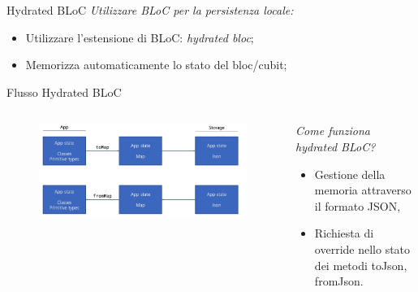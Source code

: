 \documentclass{../libs/presentation_format}
\begin{document}

\begin{frame}{Hydrated BLoC}
	\emph{Utilizzare BLoC per la persistenza locale:}
	\begin{itemize}
		\item Utilizzare l'estensione di BLoC: \emph{hydrated bloc};
		\item Memorizza automaticamente lo stato del bloc/cubit;
	\end{itemize}
\end{frame}


\begin{frame}{Flusso Hydrated BLoC}
	\begin{minipage}[0.2\textheight]{\textwidth}
		\begin{columns}[T]
			\begin{column}{0.4\textwidth}
				\begin{figure}[htpb]
					\centering
					\includegraphics[scale=0.18]{../libs/hydrated-bloc-flow}
				\end{figure}
			\end{column}
			\begin{column}{0.6\textwidth}
				\emph{Come funziona hydrated BLoC?}
				\begin{itemize}
					\item Gestione della memoria attraverso il formato JSON,
					\item Richiesta di override nello stato dei metodi toJson, fromJson.
				\end{itemize}
			\end{column}
		\end{columns}
	\end{minipage}
\end{frame}
\end{document}
